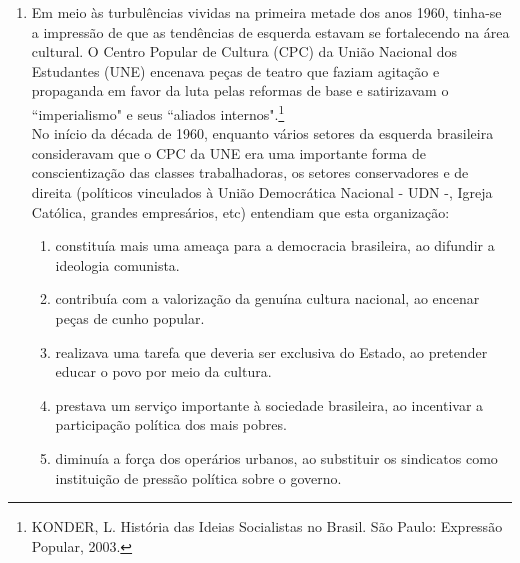 \documentclass[10pt,a4paper]{article}
\begin{document}
\begin{multicols}{2}
\begin{enumerate}

	\item  Em meio \`as turbul\^encias vividas na primeira metade dos anos 1960, tinha-se a impress\~ao de que 
as tend\^encias de esquerda estavam se fortalecendo na \'area cultural. O Centro Popular de Cultura (CPC) da Uni\~ao Nacional dos Estudantes (UNE) encenava pe\c{c}as de teatro que faziam agita\c{c}\~ao e propaganda em favor da luta pelas reformas de base e satirizavam  o ``imperialismo" e seus ``aliados internos".\footnote{KONDER, L. Hist\'oria das Ideias Socialistas no Brasil. S\~ao Paulo: Express\~ao Popular, 2003.}\\
	No in\'icio da d\'ecada de 1960, enquanto v\'arios setores da esquerda brasileira consideravam 
que o CPC da UNE era uma importante forma de conscientiza\c{c}\~ao das classes trabalhadoras, 
os setores conservadores e de direita (pol\'iticos vinculados \`a Uni\~ao Democr\'atica Nacional - UDN -, 
Igreja Cat\'olica, grandes empres\'arios, etc) entendiam que esta organiza\c{c}\~ao:
		\begin{enumerate}
		\item constitu\'ia mais uma amea\c{c}a para a democracia brasileira, ao difundir a ideologia comunista.
		\item contribu\'ia com a valoriza\c{c}\~ao da genu\'ina cultura nacional, ao encenar pe\c{c}as de cunho popular.
		\item realizava uma tarefa que deveria ser exclusiva do Estado, ao pretender educar o povo por meio da cultura.
		\item prestava um servi\c{c}o importante \`a sociedade brasileira, ao incentivar a participa\c{c}\~ao pol\'itica dos 
mais pobres.
		\item diminu\'ia a for\c{c}a dos oper\'arios urbanos, ao substituir os sindicatos como institui\c{c}\~ao de press\~ao pol\'itica sobre o governo.
		\end{enumerate}


\end{enumerate}
\end{multicols}
\end{document}
